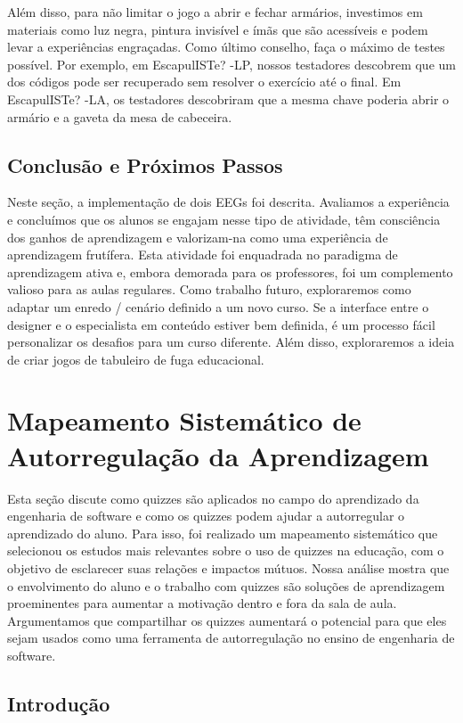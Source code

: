 Além disso, para não limitar o jogo a abrir e fechar armários, investimos em materiais como luz negra, pintura invisível e ímãs que são acessíveis e podem levar a experiências engraçadas. Como último conselho, faça o máximo de testes possível. Por exemplo, em EscapulISTe? -LP, nossos testadores descobrem que um dos códigos pode ser recuperado sem resolver o exercício até o final. Em EscapulISTe? -LA, os testadores descobriram que a mesma chave poderia abrir o armário e a gaveta da mesa de cabeceira.

\subsection{Conclusão e Próximos Passos}

Neste seção, a implementação de dois EEGs foi descrita. Avaliamos a experiência e concluímos que os alunos se engajam nesse tipo de atividade, têm consciência dos ganhos de aprendizagem e valorizam-na como uma experiência de aprendizagem frutífera. Esta atividade foi enquadrada no paradigma de aprendizagem ativa e, embora demorada para os professores, foi um complemento valioso para as aulas regulares. Como trabalho futuro, exploraremos como adaptar um enredo / cenário definido a um novo curso. Se a interface entre o designer e o especialista em conteúdo estiver bem definida, é um processo fácil personalizar os desafios para um curso diferente. Além disso, exploraremos a ideia de criar jogos de tabuleiro de fuga educacional.


\section{Mapeamento Sistemático de Autorregulação da Aprendizagem}

Esta seção discute como quizzes são aplicados no campo do aprendizado da engenharia de software e como os quizzes podem ajudar a autorregular o aprendizado do aluno. Para isso, foi realizado um mapeamento sistemático que selecionou os estudos mais relevantes sobre o uso de quizzes na educação, com o objetivo de esclarecer suas relações e impactos mútuos. Nossa análise mostra que o envolvimento do aluno e o trabalho com quizzes são soluções de aprendizagem proeminentes para aumentar a motivação dentro e fora da sala de aula. Argumentamos que compartilhar os quizzes aumentará o potencial para que eles sejam usados como uma ferramenta de autorregulação no ensino de engenharia de software. 

\subsection{Introdução}


